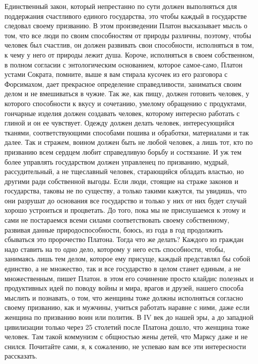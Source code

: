 Единственный закон, который непрестанно по сути должен
выполняться для поддержания счастливого единого государства, это чтобы каждый в
государстве следовал своему призванию. В этом произведении Платон высказывает
мысль о том, что все люди по своим способностям от природы различны, поэтому,
чтобы человек был счастлив, он должен развивать свои способности, исполняться в
том, к чему у него от природы лежит душа. Короче, исполняться в своем
собственном, в полном согласии с энтологическим основанием, которое самое-само,
Платон устами Сократа, помните, выше я вам стирала кусочек из его разговора с
Форсимахом, дает прекрасное определение справедливости, заниматься своим делом и
не вмешиваться в чужие. Так же, как пищу, должен готовить человек, у которого
способности к вкусу и сочетанию, умелому обращению с продуктами, гончарные
изделия должен создавать человек, которому интересно работать с глиной и он ее
чувствует. Одежду должен делать человек, интересующийся тканями,
соответствующими способами пошива и обработки, материалами и так далее. Так и
стражем, воином должен быть не любой человек, а лишь тот, кто по призванию всем
сердцем любит справедливую борьбу и состязание. И уж тем более управлять
государством должен управленец по призванию, мудрый, рассудительный, а не
тщеславный человек, старающийся обладать властью, но другими ради собственной
выгоды. Если люди, стоящие на страже законов и государства, таковы не по
существу, а только такими кажутся, ты увидишь, что они разрушат до основания все
государство и только у них от них будет случай хорошо устроиться и процветать.
До того, пока мы не прислушаемся к этому и сами не постараемся всеми силами
соответствовать своему собственному, развивая данные природоспособности, боюсь,
из года в год продолжить сбываться это пророчество Платона. Тогда что же делать?
Каждого из граждан надо ставить на то одно дело, которому у него есть
способности, чтобы, занимаясь лишь тем делом, которое ему присуще, каждый
представлял бы собой единство, а не множество, так и все государство в целом
станет единым, а не множественным, пишет Платон. в этом его сочинение просто
клайдис полезных и продуктивных идей по поводу войны и мира, врагов и друзей,
нашего способа мыслить и познавать, о том, что женщины тоже должны исполняться
согласно своему призванию, как и мужчины, учиться работать наравне с ними, даже
если женщина по призванию воин или политик. В IV век до нашей эры, а до западной
цивилизации только через 25 столетий после Платона дошло, что женщина тоже
человек. Там такой коммунизм с общностью жены детей, что Марксу даже и не
снился. Почитайте сами, я, к сожалению, не успеваю вам все эти интересности
рассказать. 

